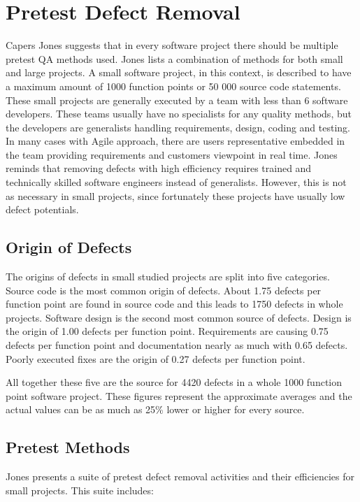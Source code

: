  \section{Pretest Defect Removal}

Capers Jones suggests that in every software project there should be multiple pretest QA methods used. Jones lists a combination of methods for both small and large projects. A small software project, in this context, is described to have a maximum amount of 1000 function points or 50 000 source code statements. These small projects are generally executed by a team with less than 6 software developers. These teams usually have no specialists for any quality methods, but the developers are generalists handling requirements, design, coding and testing. In many cases with Agile approach, there are users representative embedded in the team providing requirements and customers viewpoint in real time. Jones reminds that removing defects with high efficiency requires trained and technically skilled software engineers instead of generalists. However, this is not as necessary in small projects, since fortunately these projects have usually low defect potentials.

\subsection{Origin of Defects}

The origins of defects in small studied projects are split into five categories. Source code is the most common origin of defects. About 1.75 defects per function point are found in source code and this leads to 1750 defects in whole projects. Software design is the second most common source of defects. Design is the origin of 1.00 defects per function point. Requirements are causing 0.75 defects per function point and documentation nearly as much with 0.65 defects. Poorly executed fixes are the origin of 0.27 defects per function point. 

All together these five are the source for 4420 defects in a whole 1000 function point software project. These figures represent the approximate averages and the actual values can be as much as 25\% lower or higher for every source. 

\subsection{Pretest Methods}

Jones presents a suite of pretest defect removal activities and their efficiencies for small projects. This suite includes:

